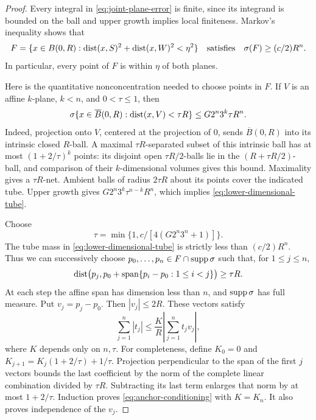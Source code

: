 \begin{proof}
Every integral in \eqref{eq:joint-plane-error} is finite, since its integrand
is bounded on the ball and upper growth implies local finiteness.  Markov's
inequality shows that
\[
 F=\{x\in B(0,R):\operatorname{dist}(x,S)^2+\operatorname{dist}(x,W)^2<\eta^2\}
 \quad\hbox{satisfies}\quad \sigma(F)\ge(c/2)R^n.
\]
In particular, every point of $F$ is within $\eta$ of both planes.

Here is the quantitative nonconcentration needed to choose points in $F$.
If $V$ is an affine $k$-plane, $k<n$, and $0<\tau\le1$, then
\begin{equation}\label{eq:lower-dimensional-tube}
 \sigma\{x\in\overline B(0,R):\operatorname{dist}(x,V)<\tau R\}
 \le G2^n3^k\tau R^n.
\end{equation}
Indeed, projection onto $V$, centered at the projection of $0$, sends
$\overline B(0,R)$ into its intrinsic closed $R$-ball.  A maximal
$\tau R$-separated subset of this intrinsic ball has at most
$(1+2/\tau)^k$ points: its disjoint open $\tau R/2$-balls lie in the
$(R+\tau R/2)$-ball, and comparison of their $k$-dimensional volumes gives
this bound.  Maximality gives a $\tau R$-net.  Ambient balls of radius
$2\tau R$ about its points cover the indicated tube.  Upper growth gives
$G2^n3^k\tau^{n-k}R^n$, which implies
\eqref{eq:lower-dimensional-tube}.

Choose
\[
 \tau=\min\{1,c/[4(G2^n3^n+1)]\}.
\]
The tube mass in \eqref{eq:lower-dimensional-tube} is strictly less than
$(c/2)R^n$.  Thus we can successively choose
$p_0,\ldots,p_n\in F\cap\operatorname{supp}\sigma$ such that, for $1\le j\le n$,
\[
 \operatorname{dist}\bigl(p_j,p_0+\operatorname{span}
              \{p_i-p_0:1\le i<j\}\bigr)\ge\tau R.
\]
At each step the affine span has dimension less than $n$, and $\operatorname{supp}\sigma$
has full measure.  Put $v_j=p_j-p_0$.  Then $|v_j|\le2R$.  These vectors
satisfy
\begin{equation}\label{eq:anchor-conditioning}
 \sum_{j=1}^n|t_j|\le \frac KR\left|\sum_{j=1}^nt_jv_j\right|,
\end{equation}
where $K$ depends only on $n,\tau$.  For completeness, define
$K_0=0$ and $K_{j+1}=K_j(1+2/\tau)+1/\tau$.
Projection perpendicular to the span of the first $j$ vectors bounds the
last coefficient by the norm of the complete linear combination divided
by $\tau R$.  Subtracting its last term enlarges that norm by at most
$1+2/\tau$.  Induction proves \eqref{eq:anchor-conditioning} with $K=K_n$.
It also proves independence of the $v_j$.


\end{proof}
